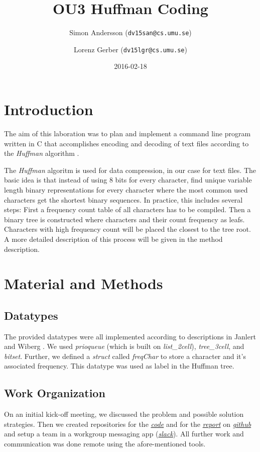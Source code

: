 \documentclass[a4paper,11pt,twoside]{article}
\title{OU3 Huffman Coding}
\author{Simon Andersson ({\tt{dv15san@cs.umu.se}})}
\author{Lorenz Gerber ({\tt{dv15lgr@cs.umu.se}})}
\date{2016-02-18}
\begin{document}
\lstset{language=C}
\maketitle
\thispagestyle{empty}

\newpage
\thispagestyle{empty}
\tableofcontents
\newpage

\clearpage
{} 

\section{Introduction} 
The aim of this laboration was to plan and implement a command line
program written in C that accomplishes encoding and decoding of 
text files according to the \emph{Huffman} algorithm \cite{huffman1952}.

The \emph{Huffman} algoritm is used for data compression, in our case
for text files. The basic idea is that instead of using 8 bits for
every character, find unique variable length binary representations
for every character where the most common used characters get the
shortest binary sequences. In practice, this includes several steps:
First a frequency count table of all characters has to be
compiled. Then a binary tree is constructed where characters and their
count frequency as leafs. Characters with high frequency count will be
placed the closest to the tree root. A more detailed description of
this process will be given in the method description.



\section{Material and Methods}
\subsection{Datatypes}
The provided datatypes were all implemented according to descriptions
in Janlert and Wiberg \cite{janlert2000}. We used \emph{prioqueue}
(which is built on \emph{list\_2cell}), \emph{tree\_3cell}, and
\emph{bitset}. Further, we defined a \emph{struct} called
\emph{freqChar} to store a character and it's associated frequency. 
This datatype was used as label in the Huffman tree.


\subsection{Work Organization}
On an initial kick-off meeting, we discussed the problem and possible
solution strategies. Then we created repositories for the 
\emph{\href{https://github.com/lorenzgerber/huffman}{code}} and for
the \emph{\href{https://github.com/lorenzgerber/report_huffman}{report}}
on \emph{\href{https://github.com}{github}} and setup a team in a 
workgroup messaging  app (\emph{\href{https://slack.com}{slack}}). All
further work and communication was done remote using the
afore-mentioned tools. 
\end{document}
